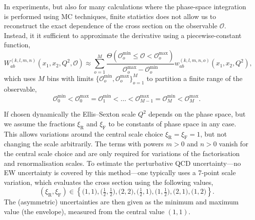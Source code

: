 In experiments, but also for many calculations where the phase-space integration is performed using MC techniques, finite statistics does not allow us to reconstruct the exact dependence of the cross section on the observable $\mathcal{O}$.
Instead, it it sufficient to approximate the derivative using a piecewise-constant function,
\begin{equation}
W_{ab}^{(k,l,m,n)} \left( x_1, x_2, Q^2, \mathcal{O} \right) \approx \sum_{o=1}^M \frac{\Theta (\mathcal{O}_o^\mathrm{min} \le \mathcal{O} < \mathcal{O}_o^\mathrm{max})}{\mathcal{O}_o^\mathrm{max} - \mathcal{O}_o^\mathrm{min}} w_{ab}^{(k,l,m,n,o)} \left( x_1, x_2, Q^2 \right) \text{,}
\end{equation}
which uses $M$ bins with limits $\{ \mathcal{O}_o^\mathrm{min}, \mathcal{O}_o^\mathrm{max} \}_{o=1}^M$ to partition a finite range of the observable,
\begin{equation}
\mathcal{O}_0^\mathrm{min} < \mathcal{O}_0^\mathrm{max} = \mathcal{O}_1^\mathrm{min} < \ldots < \mathcal{O}_{M-1}^\mathrm{max} = \mathcal{O}_M^\mathrm{min} < \mathcal{O}_M^\mathrm{max} \text{.}
\label{eq:bins-of-diff-xsection}
\end{equation}



If chosen dynamically the Ellis--Sexton scale $Q^2$ depends on the phase space, but we assume the fractions $\xi_\mathrm{R}$ and $\xi_\mathrm{F}$ to be constants of phase space in any case.
This allows variations around the central scale choice $\xi_\mathrm{R} = \xi_\mathrm{F} = 1$, but not changing the scale arbitrarily.
The terms with powers $m > 0$ and $n > 0$ vanish for the central scale choice and are only required for variations of the factorisation and renormalisation scales.
To estimate the perturbative QCD uncertainty---no EW uncertainty is covered by this method---one typically uses a 7-point scale variation, which evaluates the cross section using the following values,
\begin{equation}
(\xi_\mathrm{R}, \xi_\mathrm{F}) \in \left\{ \bigl( 1, 1 \bigr), \bigl( \tfrac{1}{2}, \tfrac{1}{2} \bigr), \bigl( 2, 2 \bigr), \bigl( \tfrac{1}{2}, 1 \bigr), \bigl( 1, \tfrac{1}{2} \bigr), \bigl( 2, 1 \bigr), \bigl( 1, 2 \bigr) \right\} \text{.}
\end{equation}
The (asymmetric) uncertainties are then given as the minimum and maximum value (the envelope), measured from the central value $(1, 1)$.


